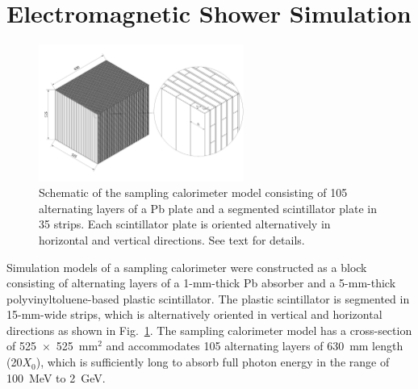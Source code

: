 \documentclass[preprint,12pt,times,a4paper]{elsarticle}
\begin{document}
\section{Electromagnetic Shower Simulation}
\label{sec:ems}

\begin{figure}[!hbt]
\includegraphics[width=0.6\textwidth]{figures/FullLayer_3.jpeg}
\caption{ Schematic of the sampling calorimeter model consisting of 105 alternating layers of a Pb plate and a segmented scintillator plate in 35 strips. Each scintillator plate is oriented alternatively in horizontal and vertical directions. See text for details. }
\label{fig:det_conf}
\end{figure}

Simulation models of a sampling calorimeter were constructed as a block consisting of alternating layers of a 1-mm-thick Pb absorber and a 5-mm-thick polyvinyltoluene-based plastic scintillator. The plastic scintillator is segmented in 15-mm-wide strips, which is alternatively oriented in vertical and horizontal directions as shown in Fig.~\ref{fig:det_conf}. The sampling calorimeter model has a cross-section of 525~$\times$~525~mm$^{2}$ and accommodates 105 alternating layers of 630~mm length (20$X_{0}$), which is sufficiently long to absorb full photon energy in the range of 100~MeV to 2~GeV. 
\end{document}
